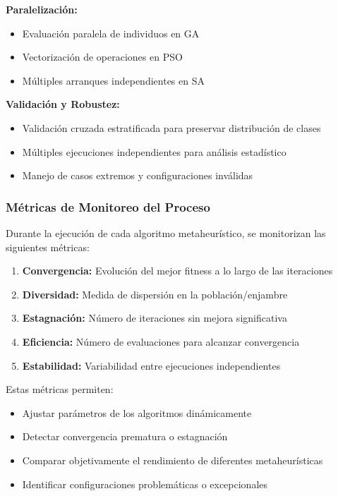 \textbf{Paralelización:}
\begin{itemize}
    \item Evaluación paralela de individuos en GA
    \item Vectorización de operaciones en PSO
    \item Múltiples arranques independientes en SA
\end{itemize}

\textbf{Validación y Robustez:}
\begin{itemize}
    \item Validación cruzada estratificada para preservar distribución de clases
    \item Múltiples ejecuciones independientes para análisis estadístico
    \item Manejo de casos extremos y configuraciones inválidas
\end{itemize}

\subsubsection{Métricas de Monitoreo del Proceso}

Durante la ejecución de cada algoritmo metaheurístico, se monitorizan las siguientes métricas:

\begin{enumerate}
    \item \textbf{Convergencia:} Evolución del mejor fitness a lo largo de las iteraciones
    \item \textbf{Diversidad:} Medida de dispersión en la población/enjambre
    \item \textbf{Estagnación:} Número de iteraciones sin mejora significativa
    \item \textbf{Eficiencia:} Número de evaluaciones para alcanzar convergencia
    \item \textbf{Estabilidad:} Variabilidad entre ejecuciones independientes
\end{enumerate}

Estas métricas permiten:
\begin{itemize}
    \item Ajustar parámetros de los algoritmos dinámicamente
    \item Detectar convergencia prematura o estagnación
    \item Comparar objetivamente el rendimiento de diferentes metaheurísticas
    \item Identificar configuraciones problemáticas o excepcionales
\end{itemize}

